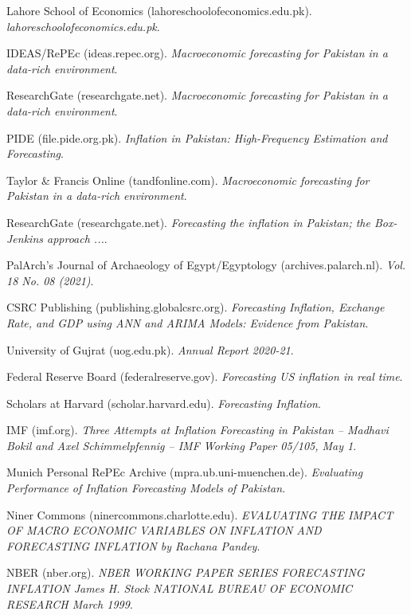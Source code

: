 \documentclass[12pt,a4paper]{article}
\begin{document}
\begin{thebibliography}{99}
 Lahore School of Economics (lahoreschoolofeconomics.edu.pk). \emph{lahoreschoolofeconomics.edu.pk}.

 IDEAS/RePEc (ideas.repec.org). \emph{Macroeconomic forecasting for Pakistan in a data-rich environment}.

 ResearchGate (researchgate.net). \emph{Macroeconomic forecasting for Pakistan in a data-rich environment}.

 PIDE (file.pide.org.pk). \emph{Inflation in Pakistan: High-Frequency Estimation and Forecasting}.

 Taylor \& Francis Online (tandfonline.com). \emph{Macroeconomic forecasting for Pakistan in a data-rich environment}.

 ResearchGate (researchgate.net). \emph{Forecasting the inflation in Pakistan; the Box-Jenkins approach ...}.

 PalArch's Journal of Archaeology of Egypt/Egyptology (archives.palarch.nl). \emph{Vol. 18 No. 08 (2021)}.

 CSRC Publishing (publishing.globalcsrc.org). \emph{Forecasting Inflation, Exchange Rate, and GDP using ANN and ARIMA Models: Evidence from Pakistan}.

 University of Gujrat (uog.edu.pk). \emph{Annual Report 2020-21}.

 Federal Reserve Board (federalreserve.gov). \emph{Forecasting US inflation in real time}.

 Scholars at Harvard (scholar.harvard.edu). \emph{Forecasting Inflation}.

 IMF (imf.org). \emph{Three Attempts at Inflation Forecasting in Pakistan -- Madhavi Bokil and Axel Schimmelpfennig -- IMF Working Paper 05/105, May 1}.

 Munich Personal RePEc Archive (mpra.ub.uni-muenchen.de). \emph{Evaluating Performance of Inflation Forecasting Models of Pakistan}.

 Niner Commons (ninercommons.charlotte.edu). \emph{EVALUATING THE IMPACT OF MACRO ECONOMIC VARIABLES ON INFLATION AND FORECASTING INFLATION by Rachana Pandey}.

 NBER (nber.org). \emph{NBER WORKING PAPER SERIES FORECASTING INFLATION James H. Stock NATIONAL BUREAU OF ECONOMIC RESEARCH March 1999}.

\end{thebibliography}
%
\end{document}
